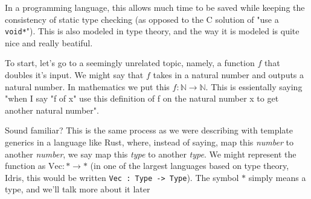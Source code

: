 In a programming language, this allows much time to be saved while keeping the consistency of static type checking (as opposed to the C solution of "use a \verb|void*|"). This is also modeled in type theory, and the way it is modeled is quite nice and really beatiful.

To start, let's go to a seemingly unrelated topic, namely, a function $f$ that doubles it's input. We might say that $f$ takes in a natural number and outputs a natural number.
In mathematics we put this $f : \mathbb{N} \to \mathbb{N}$. This is essientally saying "when I say "f of x" use this definition of f on the natural number x to get another natural number".

Sound familiar? This is the same process as we were describing with template generics in a language like Rust, where, instead of saying, map this \emph{number} to another \emph{number}, we say map this \emph{type} to another \emph{type}. We might represent the function as $\mathrm{Vec} : \ast \to \ast$ (in one of the largest languages based on type theory, Idris, this would be written \verb|Vec : Type -> Type|). The symbol $\ast$ simply means a type, and we'll talk more about it later

